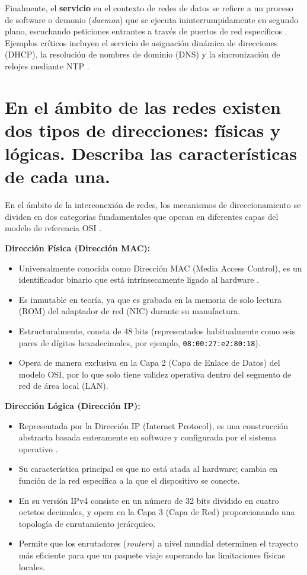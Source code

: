 \documentclass[a4paper,12pt]{article}
\begin{document}
Finalmente, el \textbf{servicio} en el contexto de redes de datos se refiere a un proceso de software o demonio (\textit{daemon}) que se ejecuta ininterrumpidamente en segundo plano, escuchando peticiones entrantes a través de puertos de red específicos \cite{ref2}. Ejemplos críticos incluyen el servicio de asignación dinámica de direcciones (DHCP), la resolución de nombres de dominio (DNS) y la sincronización de relojes mediante NTP \cite{ref6}.

\section{En el ámbito de las redes existen dos tipos de direcciones: físicas y lógicas. Describa las características de cada una.}

En el ámbito de la interconexión de redes, los mecanismos de direccionamiento se dividen en dos categorías fundamentales que operan en diferentes capas del modelo de referencia OSI \cite{ref7}.

\textbf{Dirección Física (Dirección MAC):}
\begin{itemize}
    \item Universalmente conocida como Dirección MAC (Media Access Control), es un identificador binario que está intrínsecamente ligado al hardware \cite{ref5, ref7}.
    \item Es inmutable en teoría, ya que es grabada en la memoria de solo lectura (ROM) del adaptador de red (NIC) durante su manufactura.
    \item Estructuralmente, consta de 48 bits (representados habitualmente como seis pares de dígitos hexadecimales, por ejemplo, \texttt{08:00:27:e2:80:18}).
    \item Opera de manera exclusiva en la Capa 2 (Capa de Enlace de Datos) del modelo OSI, por lo que solo tiene validez operativa dentro del segmento de red de área local (LAN).
\end{itemize}

\textbf{Dirección Lógica (Dirección IP):}
\begin{itemize}
    \item Representada por la Dirección IP (Internet Protocol), es una construcción abstracta basada enteramente en software y configurada por el sistema operativo \cite{ref7}.
    \item Su característica principal es que no está atada al hardware; cambia en función de la red específica a la que el dispositivo se conecte.
    \item En su versión IPv4 consiste en un número de 32 bits dividido en cuatro octetos decimales, y opera en la Capa 3 (Capa de Red) proporcionando una topología de enrutamiento jerárquico.
    \item Permite que los enrutadores (\textit{routers}) a nivel mundial determinen el trayecto más eficiente para que un paquete viaje superando las limitaciones físicas locales.
\end{itemize}
\end{document}
